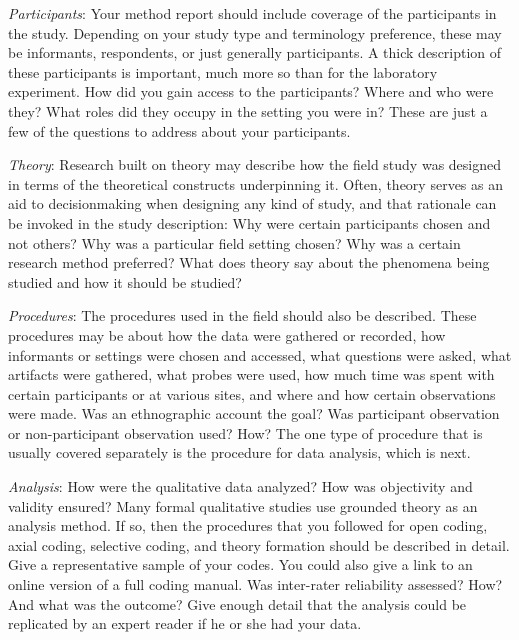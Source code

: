 \emph{Participants}: Your method report should include coverage of the participants in the study. 
Depending on your study type and terminology preference, these may be informants, respondents, or just generally participants. A thick description of these participants is important, much more so than for the laboratory experiment. 
How did you gain access to the participants?
Where and who were they? 
What roles did they occupy in the setting you were in? 
These are just a few of the questions to address about your participants.

\emph{Theory}: Research built on theory may describe how the field study was designed in terms of the theoretical constructs underpinning it. 
Often, theory serves as an aid to decisionmaking when designing any kind of study, and that rationale can be invoked in the study description: 
Why were certain participants chosen and not others? 
Why was a particular field setting chosen? 
Why was a certain research method preferred? 
What does theory say about the phenomena being
studied and how it should be studied?

\emph{Procedures}: The procedures used in the field should also be described. 
These procedures may be about how the data were
gathered or recorded, how informants or settings were chosen and accessed, what questions were asked, what artifacts were gathered, what probes were used, how much time was spent with certain participants or at various sites, and where and how certain observations were made. 
Was an ethnographic account the goal? 
Was participant observation or non-participant observation used? How? 
The one type of procedure that is usually covered separately is the procedure for data analysis, which is next.

\emph{Analysis}: How were the qualitative data analyzed? 
How was objectivity and validity ensured? Many formal qualitative studies use grounded theory as an analysis method. 
If so, then the procedures that you followed for open coding, axial coding, selective coding, and theory formation should be
described in detail. 
Give a representative sample of your codes.
You could also give a link to an online version of a full coding manual. 
Was inter-rater reliability assessed?
How? 
And what was the outcome? 
Give enough detail that the analysis could be replicated by an expert reader if he or
she had your data.
